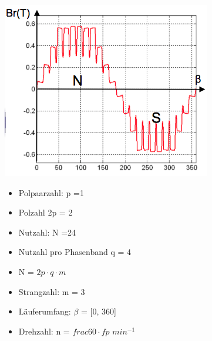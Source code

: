 \begin{minipage}{0.3 \linewidth}
\includegraphics[width = \linewidth]{./Pics/VL89/Grundbegriff}
\end{minipage}
\begin{minipage}{0.7 \linewidth}
\begin{itemize}
\item Polpaarzahl: p =1
\item Polzahl 2p = 2
\item Nutzahl: N =24
\item Nutzahl pro Phasenband q = 4
\item N = $2p \cdot q \cdot m$
\item Strangzahl: m = 3
\item Läuferumfang: $\beta$ = [0, 360]
\item Drehzahl: n = $frac{60 \cdot f}{p}$ $min^{-1}$ 
\end{itemize}
\end{minipage}

